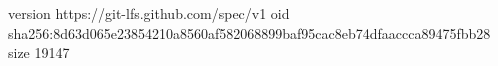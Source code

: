 version https://git-lfs.github.com/spec/v1
oid sha256:8d63d065e23854210a8560af582068899baf95cac8eb74dfaaccca89475fbb28
size 19147
